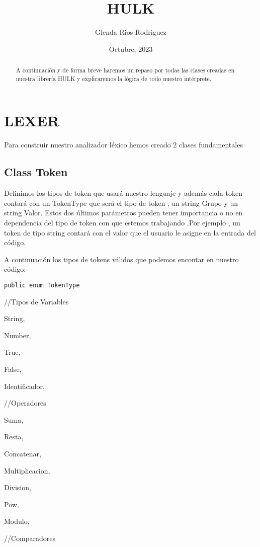 \documentclass[a4paper,12pt]{article}
\begin{document}
\title{HULK}
\author{Glenda Rios Rodriguez}
\date{Octubre, 2023}
\maketitle

\begin{abstract}
    A continuación y de forma breve haremos un repaso por todas las clases creadas en nuestra librería HULK y explicaremos la lógica de todo nuestro intérprete.
\end{abstract}

\section{LEXER}\label{sec:ent}
Para construir nuestro analizador léxico hemos creado 2 clases fundamentales

\subsection{ Class Token\texttt{}}\label{sub:center}
Definimos los tipos de token que usará nuestro lenguaje y además cada token contará con un TokenType que será el tipo de token , un string Grupo y un string Valor. Estos dos últimos parámetros pueden tener importancia o no en dependencia del tipo de token con que estemos trabajando .Por ejemplo , un token de tipo string contará con el valor que el usuario le asigne en la entrada del código.
 
A continuación los tipos de tokens válidos que podemos encontar en nuestro código:

\texttt{public enum TokenType}

    
//Tipos de Variables
    
String,
    
Number,
    
True,
    
False,
    
Identificador,
   
//Operadores
    
Suma,
    
    Resta,
    
    Concatenar,
   
    Multiplicacion,
    
    Division,
    
    Pow,
    
    Modulo,
    
    //Comparadores
    
\end{document}
